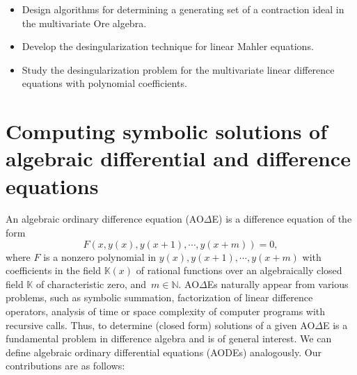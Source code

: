 \documentclass[10pt,a4paper]{article}
\newcommand{\bN}{ {\mathbb  N}}
\newcommand{\bK}{ {\mathbb  K}}
\newcommand{\AODE}{{AO{$\Delta$}E}}
\begin{document}
\begin{itemize}
\item Design algorithms for determining a generating set of a contraction ideal in the multivariate Ore algebra.

\item Develop the desingularization technique for linear Mahler equations. 

\item Study the desingularization problem for the multivariate linear difference equations with polynomial coefficients. 
\end{itemize}

\section*{Computing symbolic solutions of algebraic differential and difference equations}

An algebraic ordinary difference equation ({\AODE}) is a difference equation of the form
\[
F(x, y(x), y(x + 1), \cdots, y(x + m))=0,
\]
where $F$ is a nonzero polynomial in $y(x), y(x + 1), \cdots, y(x + m)$ with coefficients in the field $\bK(x)$ of rational functions over an algebraically closed field $\bK$ of characteristic zero, and~$m \in \bN$.
{\AODE}s naturally appear from various problems, such as symbolic summation, 
factorization of linear difference operators, 
analysis of time or space complexity of computer programs with recursive calls. 
Thus, to determine (closed form) solutions of a given {\AODE}  is a fundamental problem in difference algebra and is of general interest. 
We can define algebraic ordinary differential equations (AODEs) analogously.  Our contributions are as follows: 
\end{document}

